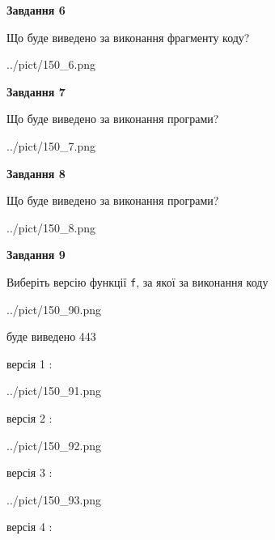 \documentclass[12pt, ukrainian]{article}
\def\code#1{\Verb!#1!}
\begin{document}
{\begin {large}
{\begin {center}\textbf{Завдання 6}\end {center}}

Що буде виведено за виконання фрагменту коду?\par
\begin{center}
	{../pict/150_6.png}
\end{center}
\newpage

{\begin {center}\textbf{Завдання 7}\end {center}}

Що буде виведено за виконання програми?\par
\begin{center}
	{../pict/150_7.png}
\end{center}
\newpage

{\begin {center}\textbf{Завдання 8}\end {center}}

Що буде виведено за виконання програми?\par
\begin{center}
	{../pict/150_8.png}
\end{center}
\newpage

{\begin {center}\textbf{Завдання 9}\end {center}}

Виберіть версію функції \code{f}, за якої за виконання коду
\begin{center}
	{../pict/150_90.png}
\end{center}
буде виведено 443

\vspace{5mm}
версія 1 :

\begin{center}
	{../pict/150_91.png}
\end{center}
версія 2 :

\begin{center}
	{../pict/150_92.png}
\end{center}
версія 3 :

\begin{center}
	{../pict/150_93.png}
\end{center}
версія 4 :


\end{large}}
\end{document}
